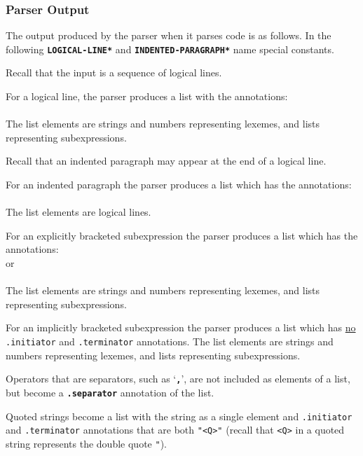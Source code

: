 \documentclass[12pt]{article}
\newcommand{\TT}[1]{{\tt \bfseries #1}}
\newcommand{\ttkey}[1]{{\tt \bfseries #1}}
\begin{document}
\subsubsection{Parser Output}
\label{PARSER-OUTPUT}

The output produced by the parser when it parses code is as
follows.  In the following \ttkey{*LOGICAL-LINE*} and
\ttkey{*INDENTED-PARAGRAPH*} name special constants.

Recall that the input is a sequence of logical lines.

For a logical line, the parser produces a list with the
annotations: \\
\hspace*{0.5in}{\tt ".initiator" => *LOGICAL-LINE*, ".terminator" => "<LF>"} \\
The list elements are strings and numbers representing lexemes, and
lists representing subexpressions.

Recall that an indented paragraph may appear at the end of a logical line.

For an indented paragraph the parser produces a list
which has the annotations: \\
\hspace*{0.5in}{\tt ".initiator" => ":",
                    ".terminator" => *INDENTED-PARAGRAPH*} \\
The list elements are logical lines.

For an explicitly bracketed subexpression the parser produces a list which has
the annotations:
\hspace*{0.5in}{\tt ".initiator" => "(", ".terminator" => ")"} \\
or \\
\hspace*{0.5in}{\tt ".initiator" => "[", ".terminator" => "]"} \\
The list elements are strings and numbers representing lexemes, and
lists representing subexpressions.

For an implicitly bracketed subexpression the parser produces a list which has
\underline{no} {\tt .initiator} and {\tt .terminator} annotations.
The list elements are strings and numbers representing lexemes, and
lists representing subexpressions.

Operators that are separators, such as `\TT{,}', are not included as elements
of a list, but become a \ttkey{.separator} annotation of the list.

Quoted strings become a list with the string as a single element
and {\tt .initiator} and {\tt .terminator} annotations that are
both {\tt "<Q>"} (recall that {\tt <Q>} in a quoted string represents
the double quote {\tt "}).
\end{document}
